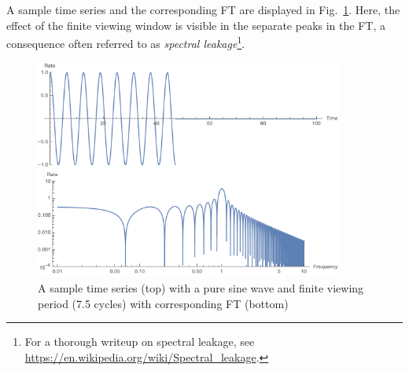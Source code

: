 A sample time series and the corresponding FT are displayed in Fig.~\ref{fig:ex_fft}. Here, the effect of the finite viewing window is visible in the separate peaks in the FT, a consequence often referred to as \textit{spectral leakage}\footnote{For a thorough writeup on spectral leakage, see \url{https://en.wikipedia.org/wiki/Spectral_leakage}.}.
\begin{figure}
    \centering
    \includegraphics[width=0.90\textwidth]{images/box_fft_sample.png}
    \caption{A sample time series (top) with a pure sine wave and finite viewing period (7.5 cycles) with corresponding FT (bottom)}
    \label{fig:ex_fft}
\end{figure}

